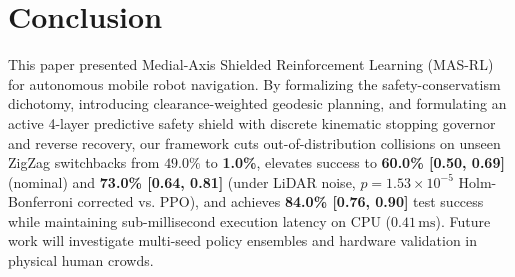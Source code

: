 \documentclass[runningheads]{llncs}
\begin{document}
\section{Conclusion}
This paper presented Medial-Axis Shielded Reinforcement Learning (MAS-RL) for autonomous mobile robot navigation. By formalizing the safety-conservatism dichotomy, introducing clearance-weighted geodesic planning, and formulating an active 4-layer predictive safety shield with discrete kinematic stopping governor and reverse recovery, our framework cuts out-of-distribution collisions on unseen ZigZag switchbacks from $49.0\%$ to \textbf{1.0\%}, elevates success to \textbf{60.0\% [0.50, 0.69]} (nominal) and \textbf{73.0\% [0.64, 0.81]} (under LiDAR noise, $p = 1.53 \times 10^{-5}$ Holm-Bonferroni corrected vs. PPO), and achieves \textbf{84.0\% [0.76, 0.90]} test success while maintaining sub-millisecond execution latency on CPU ($0.41\,\text{ms}$). Future work will investigate multi-seed policy ensembles and hardware validation in physical human crowds.
\end{document}
